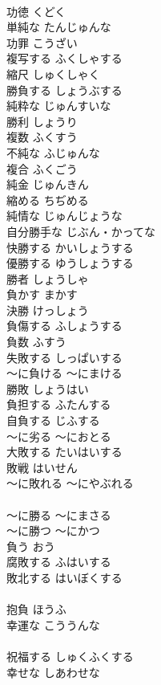 \documentclass[8pt]{extreport}
\begin{document}
\begin{CJK}{UTF8}{min}
\\	功徳	くどく	
\\	単純な	たんじゅんな	
\\	功罪	こうざい	
\\	複写する	ふくしゃする	
\\	縮尺	しゅくしゃく	
\\	勝負する	しょうぶする	
\\	純粋な	じゅんすいな	
\\	勝利	しょうり	
\\	複数	ふくすう	
\\	不純な	ふじゅんな	
\\	複合	ふくごう	
\\	純金	じゅんきん	
\\	縮める	ちぢめる	
\\	純情な	じゅんじょうな	
\\	自分勝手な	じぶん・かってな	
\\	快勝する	かいしょうする	
\\	優勝する	ゆうしょうする	
\\	勝者	しょうしゃ	
\\	負かす	まかす	
\\	決勝	けっしょう	
\\	負傷する	ふしょうする	
\\	負数	ふすう	
\\	失敗する	しっぱいする	
\\	～に負ける	～にまける	
\\	勝敗	しょうはい	
\\	負担する	ふたんする	
\\	自負する	じふする	
\\	～に劣る	～におとる	
\\	大敗する	たいはいする	
\\	敗戦	はいせん	
\\	～に敗れる	～にやぶれる	
\\	[和語]
\\	～に勝る	～にまさる	
\\	～に勝つ	～にかつ	
\\	負う	おう	
\\	腐敗する	ふはいする	
\\	敗北する	はいぼくする	
\\	[漢語]
\\	抱負	ほうふ	
\\	幸運な	こううんな	
\\	[漢語]
\\	祝福する	しゅくふくする	
\\	幸せな	しあわせな	

\end{CJK}
\end{document}
